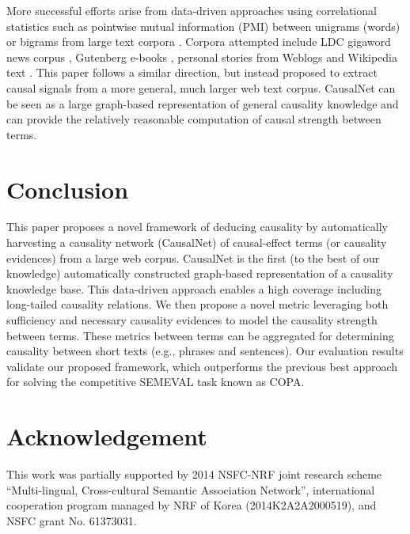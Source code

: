 \documentclass[letterpaper]{article}
\begin{document}
More successful efforts arise from data-driven approaches
using correlational statistics \cite{gordon2012copa} such as pointwise mutual
information (PMI) between unigrams (words) or bigrams from large
text corpora \cite{Mihalcea2006:CKM}. Corpora attempted include LDC
gigaword news corpus \cite{goodwin2012utdhlt}, Gutenberg e-books
\cite{roemmele2011choice}, personal stories from Weblogs
\cite{gordon2011commonsense} and Wikipedia text
\cite{jabeen2014exploiting}.
This paper follows a similar direction, but instead proposed to extract
causal signals from a more general, much larger web text corpus.
CausalNet can be seen as a large graph-based representation of general
causality knowledge and can provide the relatively reasonable computation of
causal strength between terms.

% 
\section{Conclusion}
\label{sec:conclude}
This paper proposes a novel framework of
deducing causality by automatically harvesting a
causality network (CausalNet) of causal-effect terms (or causality evidences)
from a large web corpus.
CausalNet is the first (to the best of our
knowledge) automatically constructed graph-based
representation of a causality knowledge base.
This data-driven approach enables
a high coverage including long-tailed causality
relations.
We then propose a novel metric leveraging both sufficiency and
necessary causality evidences
to model the causality strength
between terms.
These metrics between terms can be aggregated for
determining causality
between short texts (e.g., phrases and sentences).
Our evaluation results validate our proposed framework, which outperforms
the previous best approach for solving the competitive SEMEVAL task
known as COPA.

\section*{Acknowledgement}
This work was partially supported by 2014 NSFC-NRF joint research scheme 
``Multi-lingual, Cross-cultural Semantic Association Network'', international cooperation program managed by NRF of Korea
(2014K2A2A2000519),  and
NSFC grant No. 61373031.



\end{document}
